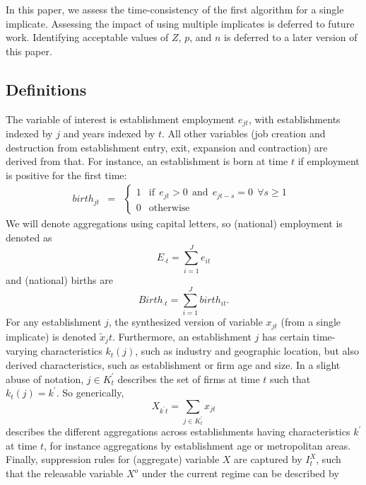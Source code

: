 In this paper, we assess the time-consistency of the first algorithm for a single implicate. 
Assessing the impact of using multiple implicates is deferred to future work. Identifying 
acceptable values of $Z$, $p$, and $n$ is deferred to a later version of this paper.

\subsection{Definitions}
The variable of interest is establishment employment $e_{jt}$, with establishments indexed by $j$ and years indexed by $t$. All other variables (job creation and destruction from establishment entry, exit, expansion and contraction) are derived from that. For instance, an establishment is born at time $t$ if employment is positive for the first time:
\begin{eqnarray}
\label{eq:e_birth}
birth_{jt} &=& \left \lbrace 
\begin{array}{rl}
1 &\mbox{if}~~  e_{jt} > 0 ~~ \mbox{and}  ~~e_{jt-s} = 0 ~~\forall s\geq 1~~\\
0 &\mbox{otherwise}
\end{array} \right .
\end{eqnarray}
We will denote aggregations using capital letters, so (national) employment is denoted as
\begin{equation}
\label{eq:national_e}
E_{\cdot t} = \sum_{i=1}^J e_{it}
\end{equation}
and (national) births are
\begin{equation}
\label{eq:national_birth}
Birth_{\cdot t} = \sum_{i=1}^J birth_{it}.
\end{equation}
For any establishment $j$, the synthesized version of variable $x_{jt}$ (from a single implicate) is 
denoted $\tilde{x}_jt$. Furthermore, an establishment $j$ has certain time-varying 
characteristics $k_t(j)$, such as industry and geographic location, but also derived 
characteristics, such as establishment or firm age and size. In a slight abuse of notation, $j \in 
K_t^\prime$ describes the set of firms at time $t$ such that $k_t(j)=k^\prime$.   So generically, 
\begin{equation}
\label{eq:sum_X}
X_{k^\prime t} =  \sum_{j \in K_t^\prime} x_{jt}
\end{equation}
describes the different aggregations across establishments having characteristics $k^\prime$ at time $t$, for instance aggregations by establishment age or metropolitan areas. 
%
Finally, suppression rules for (aggregate) variable $X$ are captured by $I_{t}^X$, such that the 
releasable variable $X^o$  under the current regime can be described by

